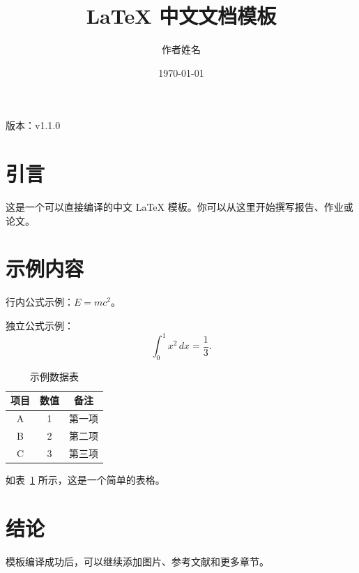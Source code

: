 \documentclass[UTF8,a4paper,12pt]{ctexart}
\title{LaTeX 中文文档模板}
\author{作者姓名}
\date{\today}
\newcommand{\documentversion}{v1.1.0}
\begin{document}
\maketitle
\begin{center}
  版本：\documentversion
\end{center}
\tableofcontents

\section{引言}

这是一个可以直接编译的中文 LaTeX 模板。你可以从这里开始撰写报告、作业或论文。

\section{示例内容}

行内公式示例：$E=mc^2$。

独立公式示例：
\begin{equation}
  \int_0^1 x^2\,dx = \frac{1}{3}.
\end{equation}

\begin{table}[htbp]
  \centering
  \caption{示例数据表}
  \label{tab:example}
  \begin{tabular}{ccc}
    \toprule
    项目 & 数值 & 备注 \\
    \midrule
    A & 1 & 第一项 \\
    B & 2 & 第二项 \\
    C & 3 & 第三项 \\
    \bottomrule
  \end{tabular}
\end{table}

如表~\ref{tab:example} 所示，这是一个简单的表格。

\section{结论}

模板编译成功后，可以继续添加图片、参考文献和更多章节。
\end{document}
